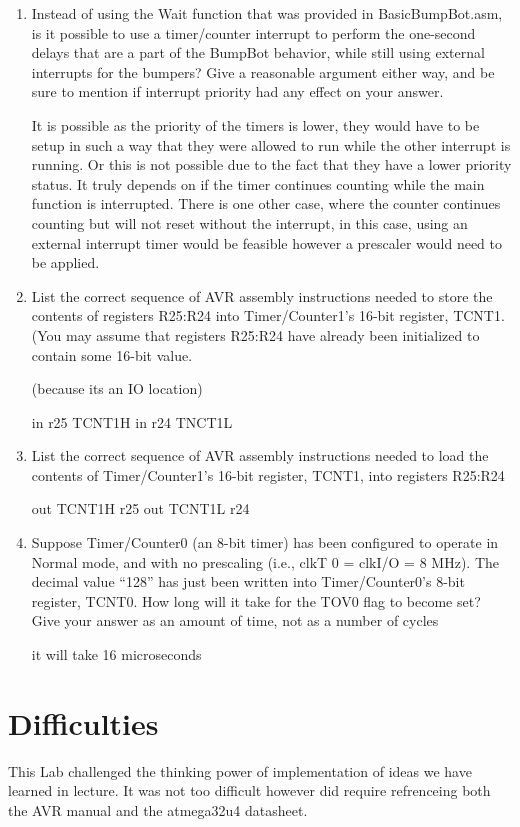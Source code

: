 \documentclass[12pt,letterpaper]{article}
\begin{document}
\begin{enumerate}
    
    \item 
    Instead of using the Wait function that was provided in BasicBumpBot.asm, is it possible to use a timer/counter interrupt to perform the one-second delays that are a part of the BumpBot behavior, while still using external
    interrupts for the bumpers? Give a reasonable argument either way, and be sure to mention if interrupt priority had any effect on your answer.
    
    It is possible as the priority of the timers is lower, they would have to be setup in such a way that they were allowed to run while the other interrupt is running. Or this is not possible due to the fact that they have a lower priority status. It truly depends on if the timer continues counting while the main function is interrupted. There is one other case, where the counter continues counting but will not reset without the interrupt, in this case, using an external interrupt timer would be feasible however a prescaler would need to be applied.
    
    \item 
    List the correct sequence of AVR assembly instructions needed to store the contents of registers R25:R24 into Timer/Counter1’s 16-bit register, TCNT1. (You may assume that registers R25:R24 have already been initialized to contain some 16-bit value.
    
 	
    (because its an IO location)

    in r25 TCNT1H
    in r24 TNCT1L
    
    \item
    List the correct sequence of AVR assembly instructions needed to load the contents of Timer/Counter1’s 16-bit register, TCNT1, into registers R25:R24
    
    out TCNT1H r25
	out TCNT1L r24
    
    \item 
    Suppose Timer/Counter0 (an 8-bit timer) has been configured to operate in Normal mode, and with no prescaling (i.e., clkT 0 = clkI/O = 8 MHz). The decimal value “128” has just been written into Timer/Counter0’s 8-bit
    register, TCNT0. How long will it take for the TOV0 flag to become set? Give your answer as an amount of time, not as a number of cycles
    
    it will take 16 microseconds
    
    
\end{enumerate}

\section{Difficulties}
This Lab challenged the thinking power of implementation of ideas we have learned in lecture. It was not too difficult however did require refrenceing both the AVR manual and the atmega32u4 datasheet.
\end{document}
